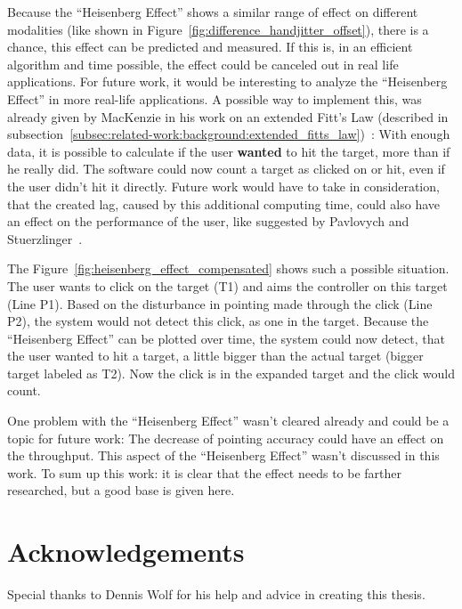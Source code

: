 Because the ``Heisenberg Effect'' shows a similar range of effect on different modalities (like shown in Figure~\ref{fig:difference_handjitter_offset}), there is a chance, this effect can be predicted and measured. If this is, in an efficient algorithm and time possible, the effect could be canceled out in real life applications. For future work, it would be interesting to analyze the ``Heisenberg Effect'' in more real-life applications. A possible way to implement this, was already given by MacKenzie in his work on an extended Fitt's Law (described in subsection~\ref{subsec:related-work:background:extended_fitts_law})~\cite{mackenzie_extending_1992}: With enough data, it is possible to calculate if the user \textbf{wanted} to hit the target, more than if he really did. The software could now count a target as clicked on or hit, even if the user didn't hit it directly. Future work would have to take in consideration, that the created lag, caused by this additional computing time, could also have an effect on the performance of the user, like suggested by Pavlovych and Stuerzlinger~\cite{pavlovych_tradeoff_2009}.

The Figure~\ref{fig:heisenberg_effect_compensated} shows such a possible situation. The user wants to click on the target (T1) and aims the controller on this target (Line P1). Based on the disturbance in pointing made through the click (Line P2), the system would not detect this click, as one in the target. Because the ``Heisenberg Effect'' can be plotted over time, the system could now detect, that the user wanted to hit a target, a little bigger than the actual target (bigger target labeled as T2). Now the click is in the expanded target and the click would count.

One problem with the ``Heisenberg Effect'' wasn't cleared already and could be a topic for future work: The decrease of pointing accuracy could have an effect on the throughput. This aspect of the ``Heisenberg Effect'' wasn't discussed in this work. To sum up this work: it is clear that the effect needs to be farther researched, but a good base is given here.

\section{Acknowledgements}
Special thanks to Dennis Wolf for his help and advice in creating this thesis. 